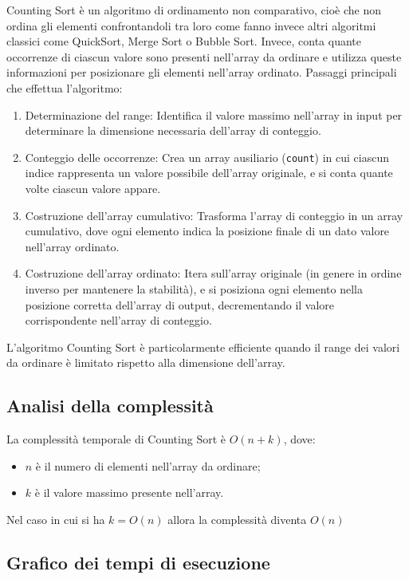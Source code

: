 \documentclass[a4paper, 12pt, oneside]{book}
\begin{document}
Counting Sort è un algoritmo di ordinamento non comparativo, cioè che non ordina gli elementi confrontandoli tra loro come fanno invece altri algoritmi classici come QuickSort, Merge Sort o Bubble Sort.
Invece, conta quante occorrenze di ciascun valore sono presenti nell'array da ordinare e utilizza queste informazioni per posizionare gli elementi nell'array ordinato. Passaggi principali che effettua l'algoritmo:

\begin{enumerate}
    \item Determinazione del range: Identifica il valore massimo nell'array in input per determinare la dimensione necessaria dell'array di conteggio.
    \item Conteggio delle occorrenze: Crea un array ausiliario (\texttt{count}) in cui ciascun indice rappresenta un valore possibile dell'array originale, e si conta quante volte ciascun valore appare.
    \item Costruzione dell'array cumulativo: Trasforma l'array di conteggio in un array cumulativo, dove ogni elemento indica la posizione finale di un dato valore nell'array ordinato.
    \item Costruzione dell'array ordinato: Itera sull'array originale (in genere in ordine inverso per mantenere la stabilità), e si posiziona ogni elemento nella posizione corretta dell'array di output, decrementando il valore corrispondente nell'array di conteggio.
\end{enumerate}

\noindent L'algoritmo Counting Sort è particolarmente efficiente quando il range dei valori da ordinare è limitato rispetto alla dimensione dell'array.

\subsection*{Analisi della complessità}

La complessità temporale di Counting Sort è \(O(n + k)\), dove:

\begin{itemize}
    \item \(n\) è il numero di elementi nell'array da ordinare;
    \item \(k\) è il valore massimo presente nell'array.
\end{itemize}

\noindent Nel caso in cui si ha \(k=O(n)\) allora la complessità diventa \(O(n)\)

\subsection*{Grafico dei tempi di esecuzione}
\end{document}
